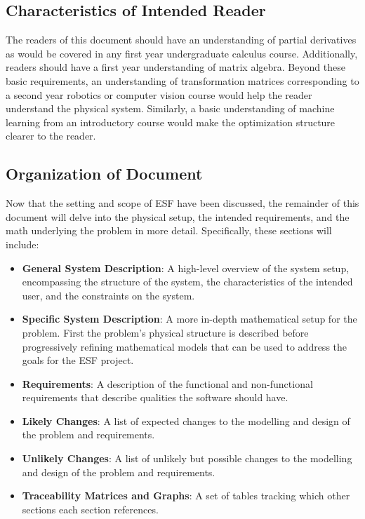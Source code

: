 \documentclass[12pt]{article}
\newcommand{\ProjectName}{ESF }
\begin{document}
\subsection{Characteristics of Intended Reader} \label{sec_IntendedReader}

The readers of this document should have an understanding of partial derivatives as 
would be covered in any first year undergraduate calculus course. Additionally,
readers should have a first year understanding of matrix algebra. Beyond these basic 
requirements, an understanding of transformation matrices corresponding to a second year 
robotics or computer vision course would help the reader understand the physical system. 
Similarly, a basic understanding of machine learning from an introductory course would 
make the optimization structure clearer to the reader. 

\subsection{Organization of Document}

Now that the setting and scope of \ProjectName have been discussed, the remainder of this document
will delve into the physical setup, the intended requirements, and the math underlying the problem in more detail.
Specifically, these sections will include:
\begin{itemize}
  \item \textbf{General System Description}: A high-level overview of the system setup, encompassing the structure of the system, the characteristics of the intended user, and the constraints on the system. 
  \item \textbf{Specific System Description}: A more in-depth mathematical setup for the problem. First the problem's physical structure is described before progressively refining mathematical models that can be used to address the goals for the \ProjectName project.
  \item \textbf{Requirements}: A description of the functional and non-functional requirements that describe qualities the software should have.
  \item \textbf{Likely Changes}: A list of expected changes to the modelling and design of the problem and requirements.
  \item \textbf{Unlikely Changes}: A list of unlikely but possible changes to the modelling and design of the problem and requirements.
  \item \textbf{Traceability Matrices and Graphs}: A set of tables tracking which other sections each section references.
\end{itemize}
\end{document}

